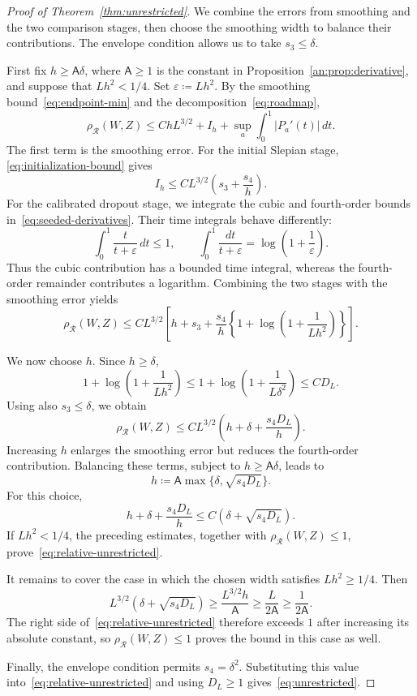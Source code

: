 \documentclass[11pt,letterpaper]{article}
\theoremstyle{remark}
\newcommand{\rh}{\rho_{\mathcal R}}
\begin{document}
{
\begin{proof}[Proof of Theorem~\ref{thm:unrestricted}]
We combine the errors from smoothing and the two comparison stages,
then choose the smoothing width to balance their contributions.
The envelope condition allows us to take \(s_3\le\delta\).

First fix \(h\ge\mathsf A\delta\), where \(\mathsf A\ge1\) is the
constant in Proposition~\ref{an:prop:derivative}, and suppose that
\(Lh^2<1/4\). Set \(\varepsilon\coloneqq Lh^2\). By the smoothing
bound~\eqref{eq:endpoint-min} and the decomposition~\eqref{eq:roadmap},
\[
 \rh(W,Z)
 \le ChL^{3/2}+I_h+\sup_a\int_0^1|P_a'(t)|\,dt.
\]
The first term is the smoothing error. For the initial Slepian stage,
\eqref{eq:initialization-bound} gives
\[
 I_h\le CL^{3/2}\left(s_3+\frac{s_4}{h}\right).
\]
For the calibrated dropout stage, we integrate the cubic and
fourth-order bounds in~\eqref{eq:seeded-derivatives}. Their time
integrals behave differently:
\[
 \int_0^1\frac{t}{t+\varepsilon}\,dt\le1,
 \qquad
 \int_0^1\frac{dt}{t+\varepsilon}
 =\log\!\left(1+\frac1\varepsilon\right).
\]
Thus the cubic contribution has a bounded time integral, whereas the
fourth-order remainder contributes a logarithm. Combining the two
stages with the smoothing error yields
\[
 \rh(W,Z)\le CL^{3/2}\left[
 h+s_3+\frac{s_4}{h}
 \left\{1+\log\!\left(1+\frac1{Lh^2}\right)\right\}
 \right].
\]

We now choose \(h\). Since \(h\ge\delta\),
\[
 1+\log\!\left(1+\frac1{Lh^2}\right)
 \le1+\log\!\left(1+\frac1{L\delta^2}\right)
 \le CD_L.
\]
Using also \(s_3\le\delta\), we obtain
\[
 \rh(W,Z)\le CL^{3/2}
 \left(h+\delta+\frac{s_4D_L}{h}\right).
\]
Increasing \(h\) enlarges the smoothing error but reduces the
fourth-order contribution. Balancing these terms, subject to
\(h\ge\mathsf A\delta\), leads to
\[
 h\coloneqq\mathsf A\max\{\delta,\sqrt{s_4D_L}\}.
\]
For this choice,
\[
 h+\delta+\frac{s_4D_L}{h}
 \le C\left(\delta+\sqrt{s_4D_L}\right).
\]
If \(Lh^2<1/4\), the preceding estimates, together with
\(\rh(W,Z)\le1\), prove~\eqref{eq:relative-unrestricted}.

It remains to cover the case in which the chosen width satisfies
\(Lh^2\ge1/4\). Then
\[
 L^{3/2}\left(\delta+\sqrt{s_4D_L}\right)
 \ge\frac{L^{3/2}h}{\mathsf A}
 \ge\frac{L}{2\mathsf A}
 \ge\frac1{2\mathsf A}.
\]
The right side of~\eqref{eq:relative-unrestricted} therefore exceeds
\(1\) after increasing its absolute constant, so \(\rh(W,Z)\le1\)
proves the bound in this case as well.

Finally, the envelope condition permits \(s_4=\delta^2\).
Substituting this value into~\eqref{eq:relative-unrestricted} and
using \(D_L\ge1\) gives~\eqref{eq:unrestricted}.
\end{proof}
}
\end{document}
